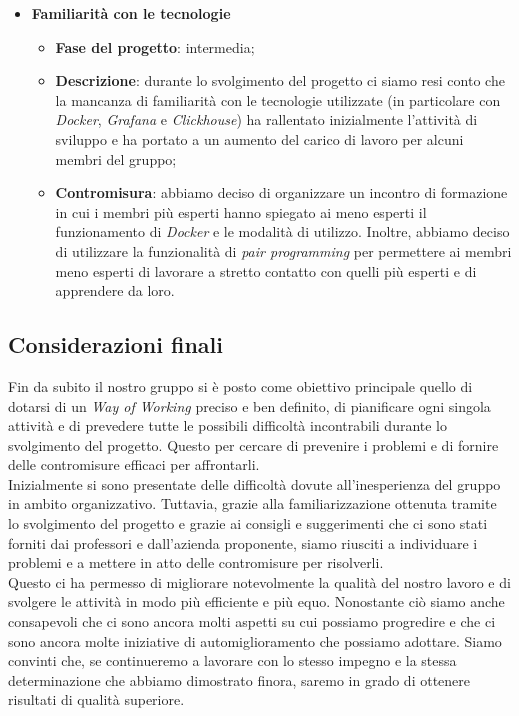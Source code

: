 \begin{itemize}
\begin{itemize}
    \end{itemize}
    \item \textbf{Familiarità con le tecnologie}
    \begin{itemize}
        \item \textbf{Fase del progetto}: intermedia;
        \item \textbf{Descrizione}: durante lo svolgimento del progetto ci siamo resi conto che la mancanza di familiarità con le tecnologie utilizzate (in particolare con \textit{Docker}, \textit{Grafana} e \textit{Clickhouse}) ha rallentato inizialmente l'attività di sviluppo e ha portato a un aumento del carico di lavoro per alcuni membri del gruppo;
        \item \textbf{Contromisura}: abbiamo deciso di organizzare un incontro di formazione in cui i membri più esperti hanno spiegato ai meno esperti il funzionamento di \textit{Docker} e le modalità di utilizzo. Inoltre, abbiamo deciso di utilizzare la funzionalità di \textit{pair programming} per permettere ai membri meno esperti di lavorare a stretto contatto con quelli più esperti e di apprendere da loro.
    \end{itemize}
\end{itemize}

\subsection{Considerazioni finali}
Fin da subito il nostro gruppo si è posto come obiettivo principale quello di dotarsi di un \textit{Way of Working} preciso e ben definito, di pianificare ogni singola attività e di prevedere tutte le possibili difficoltà incontrabili durante lo svolgimento del progetto. Questo per cercare di prevenire i problemi e di fornire delle contromisure efficaci per affrontarli. \\
Inizialmente si sono presentate delle difficoltà dovute all'inesperienza del gruppo in ambito organizzativo. Tuttavia, grazie alla familiarizzazione ottenuta tramite lo svolgimento del progetto e grazie ai consigli e suggerimenti che ci sono stati forniti dai professori e dall'azienda proponente, siamo riusciti a individuare i problemi e a mettere in atto delle contromisure per risolverli. \\
Questo ci ha permesso di migliorare notevolmente la qualità del nostro lavoro e di svolgere le attività in modo più efficiente e più equo. Nonostante ciò siamo anche consapevoli che ci sono ancora molti aspetti su cui possiamo progredire e che ci sono ancora molte iniziative di automiglioramento che possiamo adottare. Siamo convinti che, se continueremo a lavorare con lo stesso impegno e la stessa determinazione che abbiamo dimostrato finora, saremo in grado di ottenere risultati di qualità superiore.